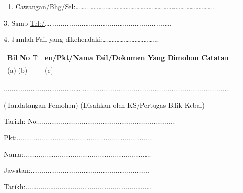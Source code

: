 \documentclass[
]{article}
\providecommand{\tightlist}{%
  \setlength{\itemsep}{0pt}\setlength{\parskip}{0pt}}
\begin{document}
\begin{enumerate}
\def\labelenumi{\arabic{enumi}.}
\setcounter{enumi}{1}
\tightlist
\item
  Cawangan/Bhg/Sel:\ldots\ldots\ldots\ldots\ldots\ldots\ldots\ldots\ldots\ldots\ldots\ldots\ldots\ldots\ldots\ldots\ldots\ldots\ldots\ldots\ldots\ldots\ldots\ldots\ldots\ldots\ldots\ldots\ldots\ldots..
\end{enumerate}

3. Samb
\url{Tel:/}\ldots.............................................................\ldots.

4. Jumlah Fail yang
dikehendaki:\ldots\ldots\ldots\ldots\ldots\ldots\ldots\ldots\ldots\ldots\ldots\ldots.

\begin{longtable}[]{@{}lll@{}}
\toprule
Bil No T & en/Pkt/Nama Fail/Dokumen Yang Dimohon Catatan
&\tabularnewline
\midrule
\endhead
(a) (b) & (c) &\tabularnewline
\bottomrule
\end{longtable}

.....................................\ldots.
..............................................................................

(Tandatangan Pemohon) (Disahkan oleh KS/Pertugas Bilik Kebal)

Tarikh:
No:......................................................................\ldots{}

Pkt:........................................................................

Nama:................................................................\ldots.

Jawatan:...............................................................

Tarikh:................................................................\ldots{}
\end{document}
